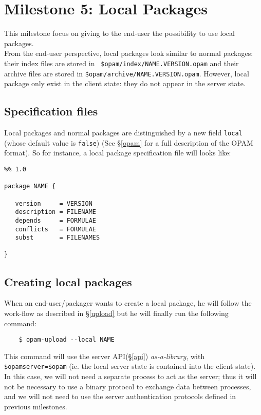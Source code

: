 \documentclass[a4paper,11pt]{article}
\begin{document}
\section{Milestone 5: Local Packages}

This milestone focus on giving to the end-user the possibility to use
local packages.\\

From the end-user perspective, local packages look similar to normal
packages: their index files are stored in {\tt
  \$opam/index/NAME.VERSION.opam} and their archive files are stored
in {\tt \$opam/archive/NAME.VERSION.opam}. However, local package only
exist in the client state: they do not appear in the server state.

\subsection{Specification files}

Local packages and normal packages are distinguished by a new field
{\tt local} (whose default value is {\tt false}) (See \S\ref{opam} for
a full description of the OPAM format). So for instance, a local
package specification file will looks like:

\begin{verbatim}
%% 1.0

package NAME {

   version     = VERSION
   description = FILENAME
   depends     = FORMULAE
   conflicts   = FORMULAE
   subst       = FILENAMES

}
\end{verbatim}

\subsection{Creating local packages}

When an end-user/packager wants to create a local package, he will
follow the work-flow as described in \S\ref{upload} but he will
finally run the following command:

\begin{verbatim}
    $ opam-upload --local NAME
\end{verbatim}

This command will use the server API(\S\ref{api}) {\em as-a-library},
with {\tt \$opamserver=\$opam} (ie. the local server state is
contained into the client state). In this case, we will not need a
separate process to act as the server; thus it will not be necessary
to use a binary protocol to exchange data between processes, and we
will not need to use the server authentication protocols defined in
previous milestones.
\end{document}
